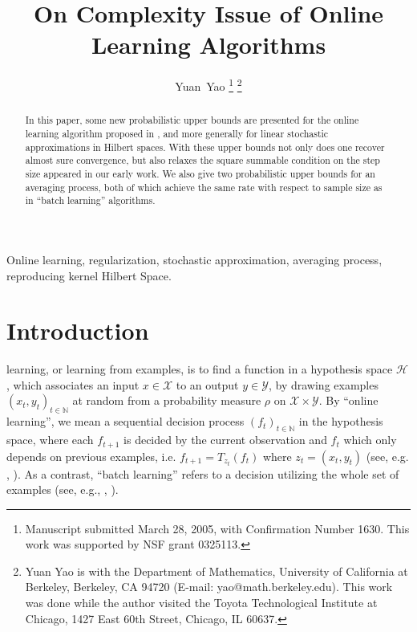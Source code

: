 \documentclass[twoside,twocolumn,journal]{IEEEtran}
\def\N{{\mathbb N}}
\def\H{{\mathscr H}}
\def\X{{\mathscr X}}
\def\Y{{\mathscr Y}}
\begin{document}
\title{On Complexity Issue of Online Learning Algorithms}

\author{Yuan~Yao
\thanks{Manuscript submitted March 28, 2005, with Confirmation Number 1630. This work was supported by NSF grant 0325113.}
\thanks{Yuan Yao is with the Department of Mathematics, University of California at Berkeley, Berkeley, CA 94720 (E-mail: yao@math.berkeley.edu). This work
was done while the author visited the Toyota Technological Institute at Chicago, 1427 East 60th Street, Chicago, IL 60637.}}

\maketitle



\begin{abstract}
In this paper, some new probabilistic upper bounds are presented for the
online learning algorithm proposed in \cite{SmaYao04}, and more
generally for linear stochastic approximations in Hilbert spaces.
With these upper bounds not only does one recover almost sure
convergence, but also relaxes the square summable condition on
the step size appeared in our early work. We also give two probabilistic
upper bounds for an averaging process, both of which achieve the
same rate with respect to sample size as in ``batch learning'' algorithms.
\end{abstract}

\begin{keywords}
Online learning, regularization, stochastic approximation, averaging
process, reproducing kernel Hilbert Space.
\end{keywords}




\section{Introduction}


 learning, or learning from examples, is to
find a function in a hypothesis space $\H$, which associates an input $x\in \X$ to an output $y\in \Y$, by drawing examples
$(x_t,y_t)_{t\in \N}$ at random from a probability measure $\rho$ on $\X\times
\Y$. By ``online learning'', we mean a sequential decision process $(f_t)_{t\in \N}$ in the
hypothesis space, where each $f_{t+1}$ is decided by the
current observation and $f_{t}$ which only depends on previous
examples, i.e. $f_{t+1}=T_{z_t}(f_t)$ where $z_t=(x_t,y_t)$ (see, e.g. \cite{SmaYao04}, \cite{CesConGen04}). As a contrast, ``batch learning'' refers to a
decision utilizing the whole set of examples (see, e.g.,
\cite{CucSma02}, \cite{EvgPonPog99}).
\end{document}
